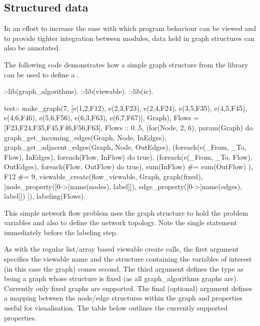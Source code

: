 \subsection{Structured data}

In an effort to increase the ease with which program behaviour can be
viewed and to provide tighter integration between {\eclipse} modules,
data held in graph structures can also be annotated.

The following code demonstrates how a simple graph structure from the
library can be used to define a \viewable{}.

\begin{code}
:-lib(graph_algorithms).
:-lib(viewable).
:-lib(ic).

test:-
    make_graph(7,
               [e(1,2,F12), e(2,3,F23), e(2,4,F24), e(3,5,F35),
                e(4,5,F45), e(4,6,F46), e(5,6,F56), e(6,3,F63),
                e(6,7,F67)],
               Graph),
    Flows = [F23,F24,F35,F45,F46,F56,F63],
    Flows :: 0..5,
    (for(Node, 2, 6), param(Graph) do
        graph_get_incoming_edges(Graph, Node, InEdges),
        graph_get_adjacent_edges(Graph, Node, OutEdges),
        (foreach(e(_From, _To, Flow), InEdges),
         foreach(Flow, InFlow) do true),
        (foreach(e(_From, _To, Flow), OutEdges),
         foreach(Flow, OutFlow) do true),
        sum(InFlow) #= sum(OutFlow)
    ),
    F12 #= 9,
    viewable_create(flow_viewable, Graph, graph(fixed),
                    [node_property([0->[name(nodes), label]]),
                     edge_property([0->[name(edges), label]])
                    ]),
    labeling(Flows).
\end{code}

This simple network flow problem uses the graph structure to hold the
problem variables and also to define the network topology.  Note the
single \viewablecreatefour{} statement immediately before the
labeling step.

As with the regular list/array based viewable create calls, the first
argument specifies the viewable name and the structure containing the
variables of interest (in this case the graph) comes second.  The
third argument defines the type as being a graph whose structure is
fixed (as all graph_algorithms graphs are).  Currently only fixed
graphs are supported.  The final (optional) argument defines a mapping
between the node/edge structures within the graph and properties
useful for visualisation.  The table below outlines the currently
supported properties.

